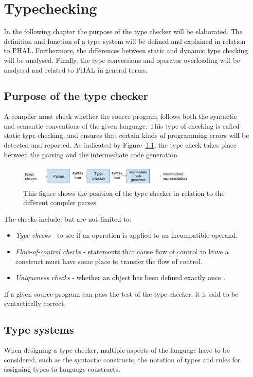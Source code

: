 \chapter{Typechecking}\label{ch:typechecking}
In the following chapter the purpose of the type checker will be elaborated. 
The definition and function of a type system will be defined and explained in relation to PHAL. 
Furthermore, the differences between static and dynamic type checking will be analysed. 
Finally, the type conversions and operator overloading will be analysed and related to PHAL in general terms.

\section{Purpose of the type checker}
A compiler must check whether the source program follows both the syntactic and semantic conventions of the given language. 
This type of checking is called static type checking, and ensures that certain kinds of programming errors will be detected and reported. 
As indicated by Figure~\ref{fig:TypeChecker}, the type check takes place between the parsing and the intermediate code generation.
\begin{figure}[H]
\centering
  \includegraphics[width=0.8\textwidth]{figures/CompilerPhases/TypeChecker.png}
  \caption{This figure shows the position of the type checker in relation to the different compiler parses.}
  \label{fig:TypeChecker}
\end{figure}
The checks include, but are not limited to:
\begin{itemize}
    \item \textit{Type checks} - to see if an operation is applied to an incompatible operand.
    \item \textit{Flow-of-control checks} - statements that cause flow of control to leave a construct must have some place to transfer the flow of control.
    \item \textit{Uniqueness checks} - whether an object has been defined exactly once \cite{Dragon}.
\end{itemize}
If a given source program can pass the test of the type checker, it is said to be syntactically correct.

\section{Type systems}
When designing a type checker, multiple aspects of the language have to be considered, such as the syntactic constructs, the notation of types and rules for assigning types to language constructs. 


